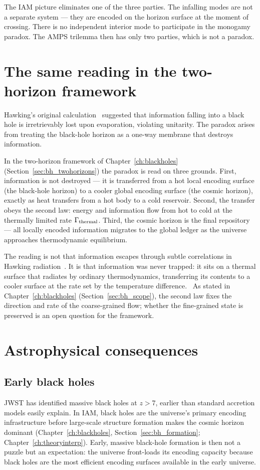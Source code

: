 The IAM picture eliminates one of the three parties. The infalling modes are not a separate system --- they are encoded on the horizon surface at the moment
of crossing. There is no independent interior mode to participate in the monogamy paradox. The AMPS trilemma then has only two parties, which is not a
paradox. \conjecture

\section{The same reading in the two-horizon framework}\label{sec:bi_twohorizon}
Hawking's original calculation~\cite{Hawking1975} suggested that information falling into a black hole is irretrievably lost upon evaporation, violating unitarity. The paradox
arises from treating the black-hole horizon as a one-way membrane that destroys information.

In the two-horizon framework of Chapter~\ref{ch:blackholes} (Section~\ref{sec:bh_twohorizons}) the paradox is read on three grounds. First, information is not destroyed --- it is
transferred from a hot local encoding surface (the black-hole horizon) to a cooler global encoding surface (the cosmic horizon), exactly as heat transfers from a
hot body to a cold reservoir. Second, the transfer obeys the second law: energy and information flow from hot to cold at the thermally limited rate
$\Gamma_{\rm thermal}$. Third, the cosmic horizon is the final repository --- all locally encoded information migrates to the global ledger as the universe approaches
thermodynamic equilibrium. \interp

The reading is not that information escapes through subtle correlations in Hawking radiation~\cite{Page1993}. It is that information was never trapped: it sits on a
thermal surface that radiates by ordinary thermodynamics, transferring its contents to a cooler surface at the rate set by the temperature difference.
\interp\ As stated in Chapter~\ref{ch:blackholes} (Section~\ref{sec:bh_scope}), the second law fixes the
direction and rate of the coarse-grained flow; whether the fine-grained state is preserved is an open question for the framework.

\section{Astrophysical consequences}\label{sec:bi_astro}
\subsection{Early black holes}
JWST has identified massive black holes at $z>7$, earlier than standard accretion models easily explain. In IAM, black holes are the universe's primary
encoding infrastructure before large-scale structure formation makes the cosmic horizon dominant (Chapter~\ref{ch:blackholes}, Section~\ref{sec:bh_formation}; Chapter~\ref{ch:theoryinterp}).
Early, massive black-hole formation is then not a puzzle but an expectation: the universe front-loads its encoding capacity because black holes are the most
efficient encoding surfaces available in the early universe. \conjecture

